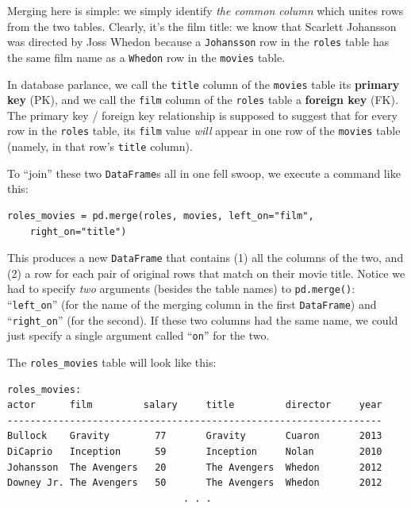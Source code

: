 Merging here is simple: we simply identify \textit{the common column} which
unites rows from the two tables. Clearly, it's the film title: we know that
Scarlett Johansson was directed by Joss Whedon because a \texttt{Johansson} row
in the \texttt{roles} table has the same film name as a \texttt{Whedon} row in
the \texttt{movies} table.

In database parlance, we call the \texttt{title} column of the \texttt{movies}
table its \textbf{primary key} (PK), and we call the \texttt{film} column of
the \texttt{roles} table a \textbf{foreign key} (FK). The primary key /
foreign key relationship is supposed to suggest that for every row in the
\texttt{roles} table, its \texttt{film} value \textit{will} appear in one row
of the \texttt{movies} table (namely, in that row's \texttt{title} column).

\bigskip
\bigskip

To ``join'' these two \texttt{DataFrame}s all in one fell swoop, we execute a
command like this:

\vspace{-.3in}
\begin{Verbatim}[fontsize=\small,samepage=true,frame=single,framesep=3mm]
roles_movies = pd.merge(roles, movies, left_on="film",
    right_on="title")
\end{Verbatim}
\vspace{-.2in}

This produces a new \texttt{DataFrame} that contains (1) all the columns of the
two, and (2) a row for each pair of original rows that match on their movie
title. Notice we had to specify \textit{two} arguments (besides the table
names) to \texttt{pd.merge()}: ``\texttt{left\_on}'' (for the name of the
merging column in the first \texttt{DataFrame}) and ``\texttt{right\_on}'' (for the
second). If these two columns had the same name, we could just specify a single
argument called ``\texttt{on}'' for the two.

\pagebreak
The \texttt{roles\_movies} table will look like this:

\bigskip
\label{roles_movies}
\begin{Verbatim}[fontsize=\footnotesize,samepage=true,frame=none]
                            roles_movies:
actor      film         salary     title         director     year
------------------------------------------------------------------
Bullock    Gravity        77       Gravity       Cuaron       2013
DiCaprio   Inception      59       Inception     Nolan        2010
Johansson  The Avengers   20       The Avengers  Whedon       2012
Downey Jr. The Avengers   50       The Avengers  Whedon       2012
                               . . .
\end{Verbatim}
\bigskip

